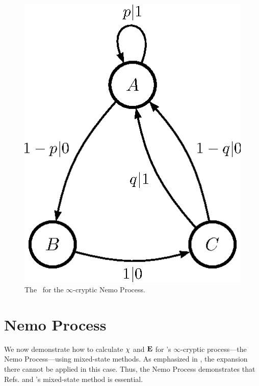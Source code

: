 \documentclass[prl,twocolumn,showpacs,superscriptaddress,preprintnumbers,floatfix]{revtex4}
\theoremstyle{plain}   \newtheorem{Lem}{Lemma}
\theoremstyle{plain} 	\newtheorem{Cor}{Corollary}
\theoremstyle{plain} 	\newtheorem{The}{Theorem}
\theoremstyle{plain} 	\newtheorem{Prop}{Proposition}
\theoremstyle{plain} 	\newtheorem*{Conj}{Conjecture}
\theoremstyle{plain}	\newtheorem*{Rem}{Remark}
\theoremstyle{plain}	\newtheorem*{Def}{Definition}
\theoremstyle{plain}	\newtheorem*{Not}{Notation}
\begin{document}
\begin{figure}[th]
\begin{center}
\includegraphics{nemo_feM_gr.eps}
\caption{The \eM\ for the $\infty$-cryptic Nemo Process.}
\label{fig:Nemo}
\end{center}
\end{figure}

\section{Nemo Process}

We now demonstrate how to calculate $\chi$ and ${\bf E}$ for 's
$\infty$-cryptic process---the Nemo Process---using mixed-state methods. As
emphasized in , the  expansion there cannot be
applied in this case. Thus, the Nemo Process demonstrates that
Refs. \cite{Crut08a} and \cite{Crut08b}'s mixed-state method is essential.
\end{document}
